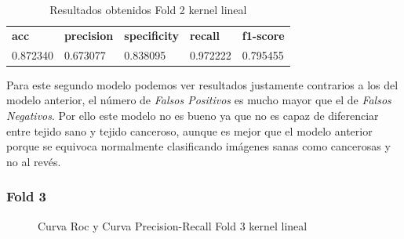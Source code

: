 \begin{table}[H]
	\centering
	\begin{tabular}{lllll}
		\textbf{acc} & \textbf{precision} & \textbf{specificity} & \textbf{recall} & \textbf{f1-score} \\
		0.872340     & 0.673077           & 0.838095             & 0.972222        & 0.795455         \\
	\end{tabular}
	\caption{Resultados obtenidos Fold 2 kernel lineal}
	\label{table:7}
\end{table}

Para este segundo modelo podemos ver resultados justamente contrarios a los del modelo anterior, el número de \textit{Falsos Positivos} es mucho mayor que el de \textit{Falsos Negativos}. Por ello este modelo no es bueno ya que no es capaz de diferenciar entre tejido sano y tejido canceroso, aunque es mejor que el modelo anterior porque se equivoca normalmente clasificando imágenes sanas como cancerosas y no al revés.

\subsubsection{Fold 3}

\begin{figure}[H]
	\centering
	\caption{Curva Roc y Curva Precision-Recall Fold 3 kernel lineal}
	\label{fig:resultados3_linear}
\end{figure}

